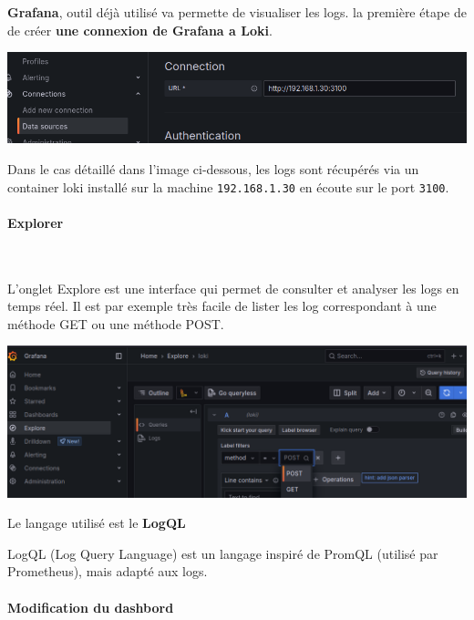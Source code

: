 \documentclass[french, 12pt]{article}%
\newcommand{\titreencadre}{Titre}
\newenvironment{encadre}[1]{\renewcommand{\titreencadre}{#1}
	\begin{mdframed}[style=encadrestyle]
	\vspace{0.5\baselineskip}
	}{%
	\end{mdframed}}
\begin{document}
\textbf{Grafana}, outil déjà utilisé va permette de visualiser les logs. la première étape de de créer \textbf{une connexion de Grafana a Loki}. 

\begin{center}
\includegraphics[scale=0.7]{./ressource/grafanRef_loki}
\end{center}
Dans le cas détaillé dans l'image ci-dessous, les logs sont récupérés via un container loki installé sur la machine \verb?192.168.1.30? en écoute sur le port \verb?3100?.


\paragraph{Explorer}\ 


L'onglet Explore est une interface qui permet de consulter et analyser les logs en temps réel. Il est par exemple très facile de lister les log correspondant à une méthode GET ou une méthode POST. 
\begin{center}
\includegraphics[scale=0.5]{./ressource/grafanaExplore}
\end{center}


Le langage utilisé est le \textbf{LogQL}

\begin{encadre}{LogQL}
LogQL (Log Query Language) est un langage inspiré de PromQL (utilisé par Prometheus), mais adapté aux logs.
\end{encadre}


\paragraph{Modification du dashbord} \  
\end{document}
